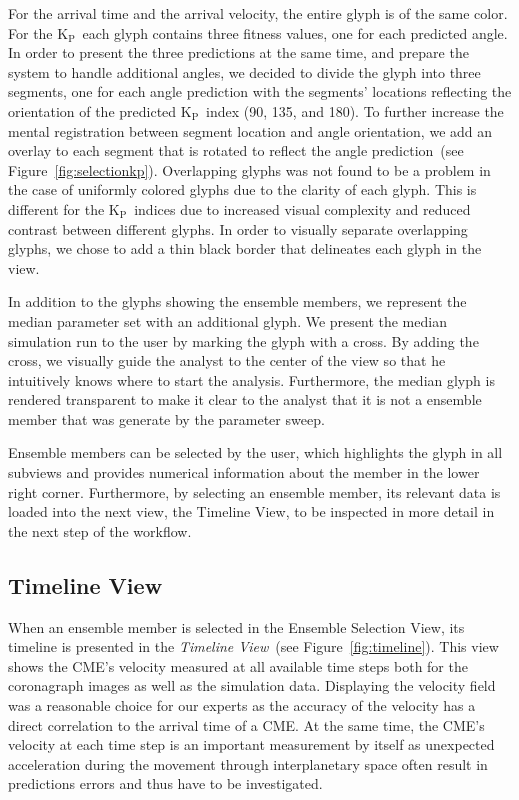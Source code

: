 \documentclass[journal]{vgtc}                %
\newcommand{\kpIndex}{$\textrm{K}_\textrm{P}$}
\begin{document}
For the arrival time and the arrival velocity, the entire glyph is of the same color. For the \kpIndex\ each glyph contains three fitness values, one for each predicted angle. In order to present the three predictions at the same time, and prepare the system to handle additional angles, we decided to divide the glyph into three segments, one for each angle prediction with the segments' locations reflecting the orientation of the predicted \kpIndex\ index (90\degree , 135\degree , and 180\degree ). To further increase the mental registration between segment location and angle orientation, we add an overlay to each segment that is rotated to reflect the angle prediction~(see Figure~\ref{fig:selectionkp}). Overlapping glyphs was not found to be a problem in the case of uniformly colored glyphs due to the clarity of each glyph. This is different for the \kpIndex\ indices due to increased visual complexity and reduced contrast between different glyphs. In order to visually separate overlapping glyphs, we chose to add a thin black border that delineates each glyph in the view.

In addition to the glyphs showing the ensemble members, we represent the median parameter set with an additional glyph. We present the median simulation run to the user by marking the glyph with a cross. By adding the cross, we visually guide the analyst to the center of the view so that he intuitively knows where to start the analysis. Furthermore, the median glyph is rendered transparent to make it clear to the analyst that it is not a ensemble member that was generate by the parameter sweep.

Ensemble members can be selected by the user, which highlights the glyph in all subviews and provides numerical information about the member in the lower right corner. Furthermore, by selecting an ensemble member, its relevant data is loaded into the next view, the Timeline View, to be inspected in more detail in the next step of the workflow.

\subsection{Timeline View} \label{sec:timeline}
When an ensemble member is selected in the Ensemble Selection View, its timeline is presented in the \emph{Timeline View}~(see Figure~\ref{fig:timeline}). This view shows the CME's velocity measured at all available time steps both for the coronagraph images as well as the simulation data. Displaying the velocity field was a reasonable choice for our experts as the accuracy of the velocity has a direct correlation to the arrival time of a CME. At the same time, the CME's velocity at each time step is an important measurement by itself as unexpected acceleration during the movement through interplanetary space often result in predictions errors and thus have to be investigated.
\end{document}
